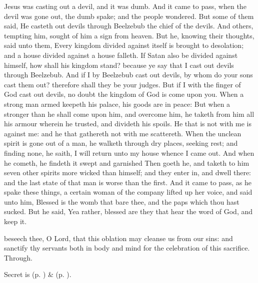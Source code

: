  Jesus was casting out a devil, and it was dumb. And it came to pass, when the devil was gone out, the dumb spake; and the people wondered. But some of them said, He casteth out devils through Beelzebub the chief of the devils. And others, tempting him, sought of him a sign from heaven. But he, knowing their thoughts, said unto them, Every kingdom divided against itself is brought to desolation; and a house divided against a house falleth. If Satan also be divided against himself, how shall his kingdom stand? because ye say that I cast out devils through Beelzebub. And if I by Beelzebub cast out devils, by whom do your sons cast them out? therefore shall they be your judges. But if I with the finger of God cast out devils, no doubt the kingdom of God is come upon you. When a strong man armed keepeth his palace, his goods are in peace: But when a stronger than he shall come upon him, and overcome him, he taketh from him all his armour wherein he trusted, and divideth his spoils. He that is not with me is against me: and he that gathereth not with me scattereth. When the unclean spirit is gone out of a man, he walketh through dry places, seeking rest; and finding none, he saith, I will return unto my house whence I came out. And when he cometh, he findeth it swept and garnished Then goeth he, and taketh to him seven other spirits more wicked than himself; and they enter in, and dwell there: and the last state of that man is worse than the first. And it came to pass, as he spake these things, a certain woman of the company lifted up her voice, and said unto him, Blessed is the womb that bare thee, and the paps which thou hast sucked. But he said, Yea rather, blessed are they that hear the word of God, and keep it.


\vspace{-0.5\baselineskip}

\secret
{} beseech thee, O Lord, that this oblation may cleanse us from our sins: and sanctify thy servants both in body and mind for the celebration of this sacrifice. Through.
\begin{rubric}
     Secret is  (p. \pageref{SPSaints}) \&   (p. \pageref{SPLivingDeparted}).
\end{rubric}

